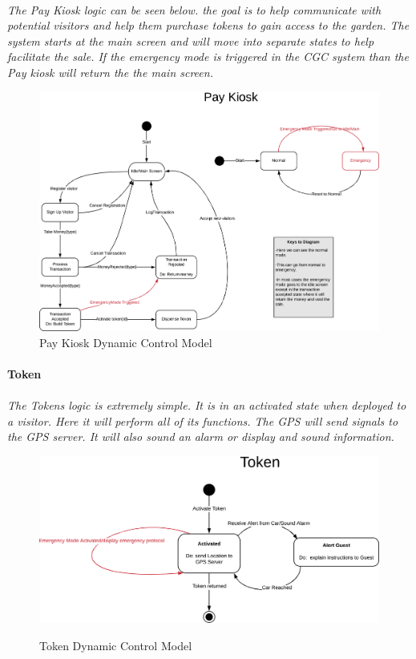 \documentclass[12pt]{article}
\begin{document}
    \paragraph{}\textit{The Pay Kiosk logic can be seen below. the goal is to help communicate with potential visitors and help them purchase tokens to gain access to the garden.
    The system starts at the main screen and will move into separate states to help facilitate the sale. If the emergency mode is triggered in the CGC system than the Pay kiosk will return the the main screen.}
    \begin{figure}[H]
         \centerline{\includegraphics[scale=0.70]{PayKiosk.png}}
         \caption{Pay Kiosk Dynamic Control Model}
          \label{fig:paykiosk}
    \end{figure}

    \paragraph{Token}
    \paragraph{}\textit{The Tokens logic is extremely simple. It is in an activated state when deployed to a visitor. Here it will perform all of its functions. The GPS will send signals to the GPS server. It will also sound an alarm or display and sound information.}
    \begin{figure}[H]
         {\includegraphics[scale=0.80]{Token.png}}
         \caption{Token Dynamic Control Model}
          \label{fig:token}
    \end{figure}
\end{document}
